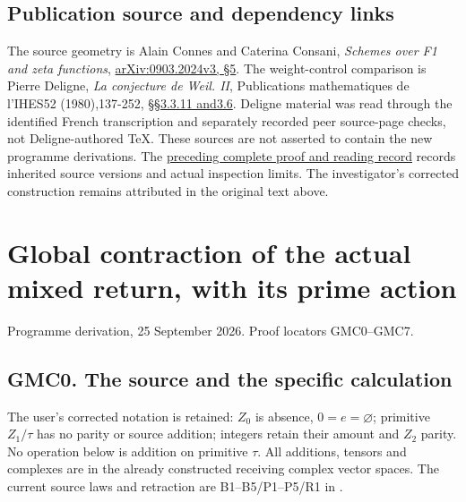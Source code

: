 \section{Publication source and dependency
links}\label{publication-source-and-dependency-links-5}

The source geometry is Alain Connes and Caterina Consani, \emph{Schemes
over F1 and zeta functions},
\href{https://arxiv.org/abs/0903.2024v3}{arXiv:0903.2024v3, §5}. The
weight-control comparison is Pierre Deligne, \emph{La conjecture de
Weil. II}, Publications mathematiques de l'IHES52 (1980),137-252,
\href{https://www.numdam.org/item/PMIHES_1980__52__137_0/}{§§3.3.11
and3.6}. Deligne material was read through the identified French
transcription and separately recorded peer source-page checks, not
Deligne-authored TeX. These sources are not asserted to contain the new
programme derivations. The
\href{https://github.com/KokunoYumeto/zeta-function-research-reader/blob/36a82ecca98addb8a98b48204e349737856c7223/workbenches/splitzero-tandem/continuations/20260924-cohomology-weight-and-character-lifts/BUILD_AND_REVIEW.md}{preceding
complete proof and reading record} records inherited source versions and
actual inspection limits. The investigator's corrected construction
remains attributed in the original text above.

\chapter{Global contraction of the actual mixed return, with its prime
action}\label{global-contraction-of-the-actual-mixed-return-with-its-prime-action}

Programme derivation, 25 September 2026. Proof locators GMC0--GMC7.

\section{GMC0. The source and the specific
calculation}\label{gmc0.-the-source-and-the-specific-calculation}

The user's corrected notation is retained: \(Z_0\) is absence,
\(0=e=\varnothing\); primitive \(Z_1/\tau\) has no parity or source
addition; integers retain their amount and \(Z_2\) parity. No operation
below is addition on primitive \(\tau\). All additions, tensors and
complexes are in the already constructed receiving complex vector
spaces. The current source laws and retraction are B1--B5/P1--P5/R1 in
\href{https://github.com/KokunoYumeto/zeta-function-research-reader/blob/36a82ecca98addb8a98b48204e349737856c7223/workbenches/splitzero-tandem/continuations/20260924-cohomology-weight-and-character-lifts/original-character-lifting/foundations/user_definitions_20260924/SOURCE_OPERATIONS_AND_PROOFS.md}{}.

